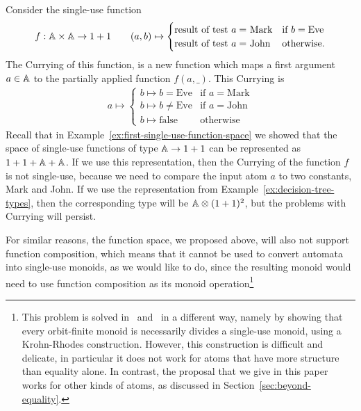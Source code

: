 \begin{example}\label{ex:Currying-not-single-use}
    Consider  the single-use function
    \begin{align*}
    f : \mathbb A \times \mathbb A \to 1 + 1 \qquad (a,b)  
    \mapsto \begin{cases}
        \text{result of test $a = $ Mark} & \text{if } b = \text{Eve} \\
        \text{result of test $a = $ John} & \text{otherwise}.
        \end{cases}
    \end{align*}
The Currying of this function, is a new function which  maps a first argument $a \in \mathbb A$ to the partially applied function $f(a,\_)$. This Currying is
\begin{align*}
    a \mapsto \begin{cases}
        b \mapsto b = \text{Eve} & \text{if } a = \text{Mark} \\
        b \mapsto b \neq \text{Eve} & \text{if } a = \text{John} \\
        b \mapsto \text{false} & \text{otherwise}
        \end{cases}
\end{align*}
Recall that in Example~\ref{ex:first-single-use-function-space} we showed that the space of single-use functions of type $\mathbb A \to 1 + 1$ can be represented as $1 + 1 + \mathbb A + \mathbb A$. If we use this representation,  then the Currying of the function $f$  is not single-use, because we need to compare the input atom $a$ to two constants, Mark and John. If we use the representation from Example~\ref{ex:decision-tree-types}, then the corresponding type will be $\mathbb A \otimes (1 + 1)^2$, but the problems with Currying will persist. \exampleend
\end{example}

For similar reasons, 
the function space, we proposed above, will also not support function composition, which means that it cannot be used to convert automata into single-use monoids, as we would like to do, since the resulting monoid would need to use function composition as its monoid operation\footnote{This problem is solved in~\cite{bojanczykstefanski2020} and~\cite{stefanski-phd} in a different way, namely by showing that every orbit-finite monoid is necessarily divides a single-use monoid, using a  Krohn-Rhodes construction. However, this construction is difficult and delicate, in particular it does not work for atoms that have more structure than equality alone. In contrast, the proposal that we give in this paper works for other kinds of atoms, as discussed in Section~\ref{sec:beyond-equality}. }

